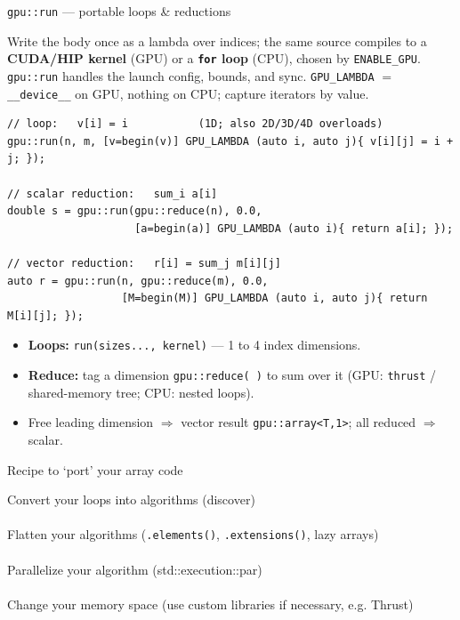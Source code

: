 \documentclass[t,aspectratio=169,handout]{beamer}
\begin{document}
\begin{frame}[fragile,label=gpurun1]{\texttt{gpu::run} --- portable loops \& reductions}

  Write the body \alert{once} as a lambda over indices; the same source
  compiles to a \textbf{CUDA/HIP kernel} (GPU) or a \textbf{\texttt{for} loop}
  (CPU), chosen by \texttt{ENABLE\_GPU}. \texttt{gpu::run} handles the launch
  config, bounds, and sync. \texttt{GPU\_LAMBDA} $=$ \texttt{\_\_device\_\_}
  on GPU, nothing on CPU; capture iterators by value.

  \begin{lstlisting}
// loop:   v[i] = i           (1D; also 2D/3D/4D overloads)
gpu::run(n, m, [v=begin(v)] GPU_LAMBDA (auto i, auto j){ v[i][j] = i + j; });

// scalar reduction:   sum_i a[i]
double s = gpu::run(gpu::reduce(n), 0.0,
                    [a=begin(a)] GPU_LAMBDA (auto i){ return a[i]; });

// vector reduction:   r[i] = sum_j m[i][j]
auto r = gpu::run(n, gpu::reduce(m), 0.0,
                  [M=begin(M)] GPU_LAMBDA (auto i, auto j){ return M[i][j]; });
  \end{lstlisting}
  \footnotesize
  \begin{itemize}
    \item \textbf{Loops:} \texttt{run(sizes..., kernel)} --- 1 to 4 index dimensions.
    \item \textbf{Reduce:} tag a dimension \texttt{gpu::reduce(\,)} to sum over it
          (GPU: \texttt{thrust} / shared-memory tree; CPU: nested loops).
    \item Free leading dimension $\Rightarrow$ vector result \texttt{gpu::array<T,1>};
          all reduced $\Rightarrow$ scalar.
  \end{itemize}
\end{frame}

\begin{frame}{Recipe to `port' your array code}
\begin{center}
  Convert your loops into algorithms (discover)\\
        \\
      Flatten your algorithms (\lstinline|.elements()|, \lstinline|.extensions()|, lazy arrays)\\
        \\
      Parallelize your algorithm (std::execution::par)\\
          \\
      Change your memory space (use custom libraries if necessary, e.g. Thrust)
\end{center}
\end{frame}
\end{document}
